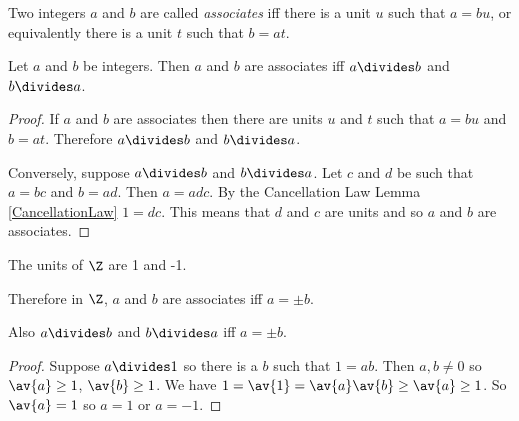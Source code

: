 \documentclass[oneside,12pt]{amsart}
\begin{document}
\begin{definition}
Two integers $a$ and $b$ are called \emph{associates} iff there
is a unit $u$ such that $a=bu$, or equivalently there is a unit $t$ such
that $b=at$.
\end{definition}

\begin{lemma}
Let $a$ and $b$ be integers. Then $a$ and $b$ are associates iff $a\divides b$
and $b\divides a$.
\end{lemma}
\begin{proof}
If $a$ and $b$ are associates then there are units $u$ and $t$ such that
$a=bu$ and $b=at$. Therefore $a\divides b$ and $b\divides a$.

Conversely, suppose $a\divides b$ and $b\divides a$. Let $c$ and $d$ be such
that $a=bc$ and $b=ad$. Then $a=adc$. By the Cancellation Law Lemma
\ref{CancellationLaw} $1=dc$. This means that $d$ and $c$ are units and so
$a$ and $b$ are associates.
\end{proof}

\begin{lemma}
The units of $\Z$ are 1 and -1.

Therefore in $\Z$, $a$ and $b$ are associates iff $a=\pm b$.

Also $a\divides b$ and $b\divides a$ iff $a=\pm b$.
\end{lemma}
\begin{proof}
Suppose $a\divides 1$ so there is a $b$ such that $1=ab$.
Then $a,b\not=0$ so $\av{a}\geq 1$, $\av{b}\geq 1$.
We have $1=\av{1} = \av{a}\av{b} \geq \av{a} \geq 1$. So $\av{a} = 1$
so $a=1$ or $a=-1$.
\end{proof}
\end{document}
